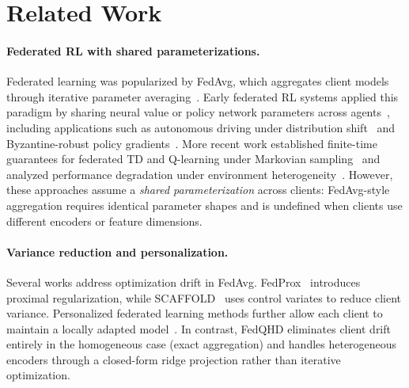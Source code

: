 \documentclass[sigconf,anonymous]{aamas}
\theoremstyle{plain}
\theoremstyle{definition}
\theoremstyle{remark}
\begin{document}
\section{Related Work}
\label{sec:related_work}

\paragraph{Federated RL with shared parameterizations.}
Federated learning was popularized by FedAvg, which aggregates client models through iterative parameter averaging~\citep{mcmahan2017communication}. Early federated RL systems applied this paradigm by sharing neural value or policy network parameters across agents~\citep{zhuo2020federated,nadiger2019federated}, including applications such as autonomous driving under distribution shift~\citep{liang2022federated} and Byzantine-robust policy gradients~\citep{fan2021fault}. More recent work established finite-time guarantees for federated TD and Q-learning under Markovian sampling~\citep{khodadadian2022federated} and analyzed performance degradation under environment heterogeneity~\citep{jin2022federated}. However, these approaches assume a \emph{shared parameterization} across clients: FedAvg-style aggregation requires identical parameter shapes and is undefined when clients use different encoders or feature dimensions.



\paragraph{Variance reduction and personalization.}
Several works address optimization drift in FedAvg. FedProx~\citep{li2020federated} introduces proximal regularization, while SCAFFOLD~\citep{karimireddy2020scaffold} uses control variates to reduce client variance. Personalized federated learning methods further allow each client to maintain a locally adapted model~\citep{fallah2020personalized}. In contrast, FedQHD eliminates client drift entirely in the homogeneous case (exact aggregation) and handles heterogeneous encoders through a closed-form ridge projection rather than iterative optimization.
\end{document}
